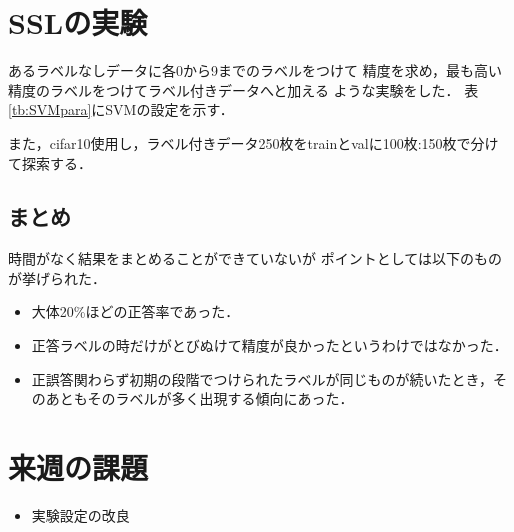 \documentclass[twocolumn]{jarticle}     %
\begin{document}
\section{SSLの実験}
あるラベルなしデータに各0から9までのラベルをつけて
精度を求め，最も高い精度のラベルをつけてラベル付きデータへと加える
ような実験をした．
表\ref{tb:SVMpara}にSVMの設定を示す．
\begin{table}[h]
	\centering
	\caption{SVMの設定\label{tb:SVMpara}}
\end{table}
また，cifar10使用し，ラベル付きデータ250枚をtrainとvalに100枚:150枚で分けて探索する．

\subsection{まとめ}
時間がなく結果をまとめることができていないが
ポイントとしては以下のものが挙げられた．\\
\begin{itemize}
	\item 大体20\%ほどの正答率であった．
	\item 正答ラベルの時だけがとびぬけて精度が良かったというわけではなかった．
	\item 正誤答関わらず初期の段階でつけられたラベルが同じものが続いたとき，そのあともそのラベルが多く出現する傾向にあった．
\end{itemize}

\section{来週の課題}
	\begin{itemize}
		\item 実験設定の改良
	\end{itemize}
\end{document}
